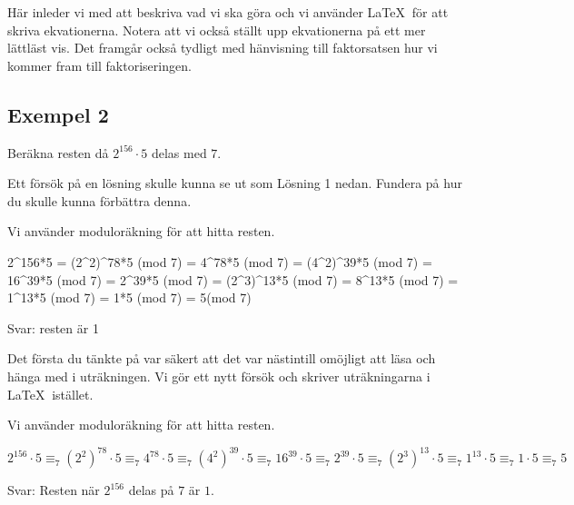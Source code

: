 \documentclass[titlepage]{article}
\begin{document}
Här inleder vi med att beskriva vad vi ska göra och vi använder \LaTeX$\:$ för att skriva ekvationerna. Notera att vi också ställt upp ekvationerna på ett mer lättläst vis. Det framgår också tydligt med hänvisning till faktorsatsen hur vi kommer fram till faktoriseringen.


\subsection*{Exempel 2}

\begin{center}
\begin{tcolorbox}[width=\linewidth,colback={white},title={\textbf{Problem}},outer arc=0mm,colupper=black]
    Beräkna resten då $2^{156}\cdot5$ delas med $7$.
\end{tcolorbox} 
\end{center}

Ett försök på en lösning skulle kunna se ut som Lösning 1 nedan. Fundera på hur du skulle kunna förbättra denna.

\begin{center}
\begin{tcolorbox}[width=\linewidth,colback={red!15!white},title={\textbf{Lösning 1 - Sämre}},outer arc=0mm,colupper=black]
    Vi använder moduloräkning för att hitta resten.

    2\textasciicircum{156}*5 = (2\textasciicircum2)\textasciicircum 78*5 (mod 7) = 4\textasciicircum78*5 (mod 7) = (4\textasciicircum2)\textasciicircum39*5 (mod 7) = 16\textasciicircum39*5 (mod 7) = 2\textasciicircum39*5 (mod 7) = (2\textasciicircum3)\textasciicircum13*5 (mod 7) = 8\textasciicircum13*5 (mod 7) = 1\textasciicircum13*5 (mod 7) = 1*5 (mod 7) = 5(mod 7)

    Svar: resten är 1
\end{tcolorbox} 
\end{center}

Det första du tänkte på var säkert att det var nästintill omöjligt att läsa och hänga med i uträkningen. Vi gör ett nytt försök och skriver uträkningarna i \LaTeX$\:$ istället.

\begin{center}
\begin{tcolorbox}[width=\linewidth,colback={red!15!white},title={\textbf{Lösning 2 - Något bättre}},outer arc=0mm,colupper=black]
    Vi använder moduloräkning för att hitta resten.

    $2^{156}\cdot 5 \equiv_7 (2^2)^{78}\cdot 5\equiv_7 4^{78} \cdot 5 \equiv_7 (4^2)^{39} \cdot 5 \equiv_7 16^{39} \cdot 5 \equiv_7 2^{39} \cdot 5 \equiv_7 (2^3)^{13} \cdot 5 \equiv_7 1^{13}\cdot 5 \equiv_7 1 \cdot 5 \equiv_7 5$

    Svar: Resten när $2^{156}$ delas på $7$ är $1$.
\end{tcolorbox} 
\end{center}
\end{document}
